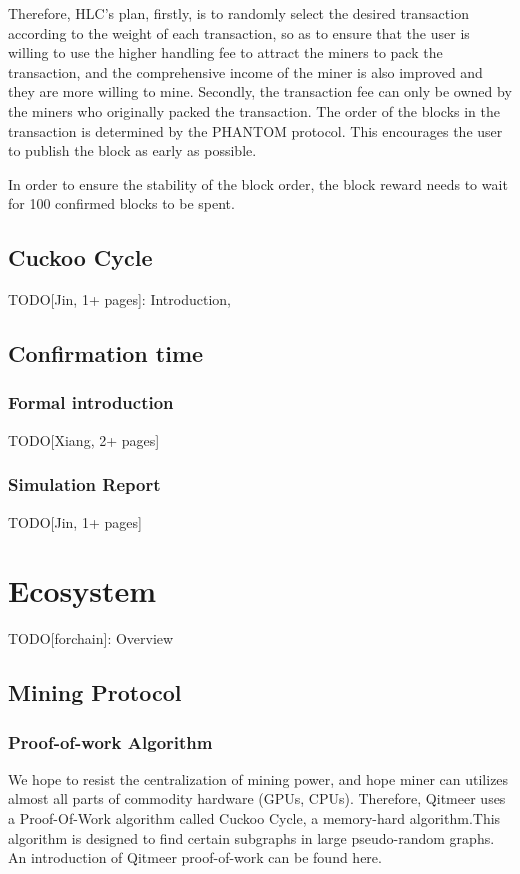 \documentclass[a4paper,11pt]{article}
\begin{document}
Therefore, HLC's plan, firstly, is to randomly select the desired transaction according to the weight of each transaction, so as to ensure that the user is willing to use the higher handling fee to attract the miners to pack the transaction, and the comprehensive income of the miner is also improved and they are more willing to mine. Secondly, the transaction fee can only be owned by the miners who originally packed the transaction. The order of the blocks in the transaction is determined by the PHANTOM protocol. This encourages the user to publish the block as early as possible.

In order to ensure the stability of the block order, the block reward needs to wait for 100 confirmed blocks to be spent.

\subsection{Cuckoo Cycle}
TODO[Jin, 1+ pages]: Introduction, 

\subsection{Confirmation time}
\subsubsection{Formal introduction}
TODO[Xiang, 2+ pages]
\subsubsection{Simulation Report}
TODO[Jin, 1+ pages]

\section{Ecosystem}
TODO[forchain]: Overview

\subsection{Mining Protocol}
\subsubsection{Proof-of-work Algorithm}

We hope to resist the centralization of mining power, and hope miner can utilizes almost all parts of commodity hardware (GPUs, CPUs).
Therefore, Qitmeer uses a Proof-Of-Work algorithm called Cuckoo Cycle\cite{cuckoocycle}, 
a memory-hard algorithm.This algorithm is designed to find certain subgraphs in large pseudo-random graphs. 
An introduction of Qitmeer proof-of-work can be found here.\cite{qitmeerpow} 
\end{document}
